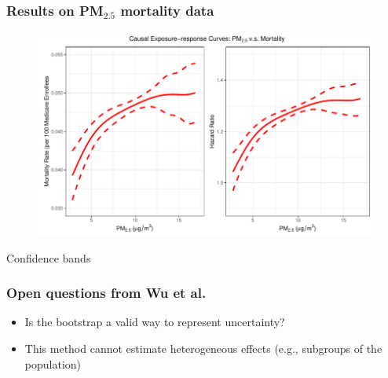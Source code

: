 \begin{frame}
  \frametitle{Results on PM$_\text{2.5}$ mortality data} 
  
  \begin{figure}[ht]
    \centering
    \includegraphics[width=\textwidth]{figures/wu-fig3.png}
  \end{figure}

  Confidence bands
  
\end{frame}





\begin{frame}
  \frametitle{Open questions from Wu et al.}
  
  \begin{itemize}
  \item Is the bootstrap a valid way to represent uncertainty? \medskip 
  \item This method cannot estimate heterogeneous effects (e.g.,
    subgroups of the population)
  \end{itemize}
  
\end{frame}

